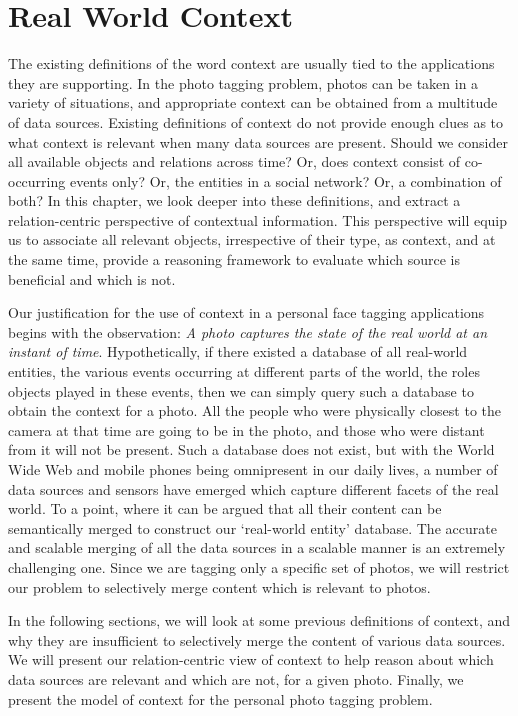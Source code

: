 \chapter{Real World Context}

The existing definitions of the word context are usually tied to the applications they are supporting. In the photo tagging problem, photos can be taken in a variety of situations, and appropriate context can be obtained from a multitude of data sources. Existing definitions of context do not provide enough clues as to what context is relevant when many data sources are present. Should we consider all available objects and relations across time? Or, does context consist of co-occurring events only? Or, the entities in a social network? Or, a combination of both? In this chapter, we look deeper into these definitions, and extract a relation-centric perspective of contextual information. This perspective will equip us to associate all relevant objects, irrespective of their type, as context, and at the same time, provide a reasoning framework to evaluate which source is beneficial and which is not.

Our justification for the use of context in a personal face tagging applications begins with the observation: \textit{A photo captures the state of the real world at an instant of time}. Hypothetically, if there existed a database of all real-world entities, the various events occurring at different parts of the world, the roles objects played in these events, then we can simply query such a database to obtain the context for a photo. All the people who were physically closest to the camera at that time are going to be in the photo, and those who were distant from it will not be present. Such a database does not exist, but with the World Wide Web and mobile phones being omnipresent in our daily lives, a number of data sources and sensors have emerged which capture different facets of the real world. To a point, where it can be argued that all their content can be semantically merged to construct our `real-world entity' database. The accurate and scalable merging of all the data sources in a scalable manner is an extremely challenging one. Since we are tagging only a specific set of photos, we will restrict our problem to selectively merge content which is relevant to photos.

In the following sections, we will look at some previous definitions of context, and why they are insufficient to selectively merge the content of various data sources. We will present our relation-centric view of context to help reason about which data sources are relevant and which are not, for a given photo. Finally, we present the model of context for the personal photo tagging problem.

